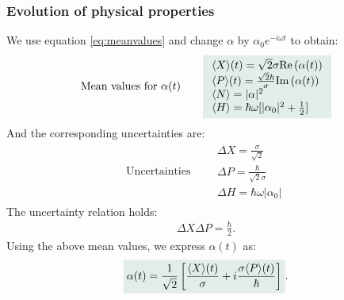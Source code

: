 \subsubsection{Evolution of physical properties}
We use equation \eqref{eq:meanvalues} and change $\alpha$ by $\alpha_0e^{-i\omega t}$ to obtain:
\begin{align}
    \text{Mean values for $\alpha(t)$}\qquad\highlight{\begin{array}{l}
        \braket{X}(t)=\sqrt{2}\sigma\re{\alpha(t)}\\
        \braket{P}(t)=\frac{\sqrt{2}\hbar}{\sigma}\im{\alpha(t)}\\
        \braket{N}=|\alpha|^2\\
        \braket{H}=\hbar\omega[|\alpha_0|^2+\frac{1}{2}]
    \end{array}}
\end{align}
And the corresponding uncertainties are:
\begin{align}
    \text{Uncertainties}\qquad\begin{array}{l}
        \Delta X=\frac{\sigma}{\sqrt{2}}\\
        \Delta P=\frac{\hbar}{\sqrt{2}\sigma}\\
        \Delta H=\hbar\omega|\alpha_0|
    \end{array}
\end{align}
The uncertainty relation holds: 
\begin{align*}
    \Delta X\Delta P=\frac{\hbar}{2}.
\end{align*}
Using the above mean values, we express $\alpha(t)$ as:
\begin{align}
    \highlight{\alpha(t)=\frac{1}{\sqrt{2}}\left[\frac{\braket{X}(t)}{\sigma}+i\frac{\sigma\braket{P}(t)}{\hbar}\right]}.
\end{align}
%
